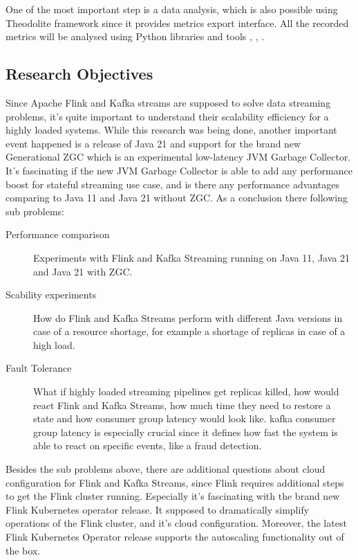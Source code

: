 One of the most important step is a data analysis, which is also possible using Theodolite framework
since it provides metrics export interface.
All the recorded metrics will be analysed using Python libraries and tools
\cite{hightower2019kubernetes}, \cite{pivotto2023prometheus}, \cite{theodolite_framework}.


\subsection{Research Objectives}\label{sec:research-objectives}
Since Apache Flink and Kafka streams are supposed to solve data streaming problems, it's
quite important to understand their scalability efficiency for a highly loaded systems.
While this research was being done, another important event happened is a release of Java 21
and support for the brand new Generational ZGC which is an experimental low-latency JVM
Garbage Collector.
It's fascinating if the new JVM Garbage Collector is able to add any performance boost for
stateful streaming use case, and is there any performance advantages comparing to Java 11
and Java 21 without ZGC.
As a conclusion there following sub problems:

\begin{description}
    \item[Performance comparison] Experiments with Flink and Kafka Streaming running on Java 11,
    Java 21 and Java 21 with ZGC.
    \item[Scability experiments] How do Flink and Kafka Streams perform with different Java versions
    in case of a resource shortage, for example a shortage of replicas in case of a high load.
    \item[Fault Tolerance] What if highly loaded streaming pipelines get replicas killed, how
    would react Flink and Kafka Streams, how much time they need to restore a state and how consumer
    group latency would look like.
    kafka consumer group latency is especially crucial since it defines how fast the system
    is able to react on specific events, like a fraud detection.
\end{description}

Besides the sub problems above, there are additional questions about cloud configuration for Flink
and Kafka Streams, since Flink requires additional steps to get the Flink cluster running.
Especially it's fascinating with the brand new Flink Kubernetes operator release.
It supposed to dramatically simplify operations of the Flink cluster, and it's cloud configuration.
Moreover, the latest Flink Kubernetes Operator release supports the autoscaling functionality out of the box.


